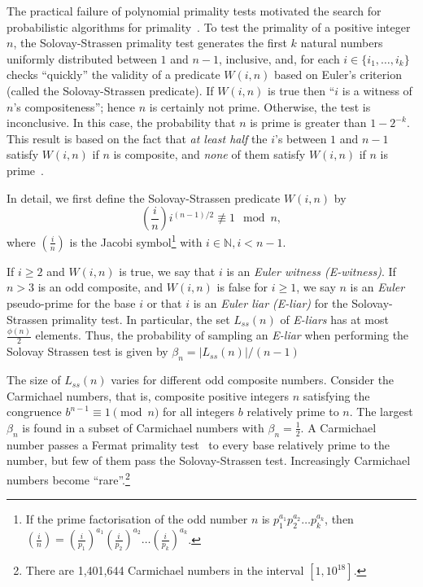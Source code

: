 \documentclass[l1pt]{elsarticle}
\begin{document}
The practical failure of polynomial primality tests motivated the search for probabilistic algorithms for primality~\cite{miller_prob_primality,rabin_prob_primality,solovay:84,solovay:118,Stiglic2011,Stiglic2011}.
To test the primality of  a positive integer $n$,  the Solovay-Strassen primality test generates the first $k$ natural numbers uniformly distributed between $1$ and $n -
1$, inclusive, and, for each $i\in\{i_1,\dots,i_k\}$ checks ``quickly'' the validity of a
predicate $W(i, n)$ based on Euler's criterion (called the Solovay-Strassen predicate).  If $W(i,
n)$ is true then ``$i$ is a witness of $n$'s compositeness''; hence $n$ is certainly not prime.
Otherwise, the test is inconclusive. In this case, the probability that $n$
is prime is greater than $1-2^{-k}$.  This result is based on the fact that {\it at
least half} the $i$'s between $1$ and $n - 1$ satisfy $W(i, n)$ if $n$ is
composite, and \emph{none} of them satisfy $W(i, n)$ if $n$ is
prime~\cite{Solovay77}.


In detail, we first define the Solovay-Strassen predicate $W(i,n)$ by
$$\left(\frac{i}{n}\right) i^{(n-1)/2} \not\equiv 1 \mod{n},$$
where $\left(\frac{i}{n}\right)$ is the Jacobi symbol\footnote{If the prime factorisation of the odd number $n$ is $p_1^{a_1}p_2^{a_2} \dots p_k^{a_k}$, then $\left(\frac{i}{n}\right) = \left(\frac{i}{p_1}\right)^{a_1} \left(\frac{i}{p_2}\right)^{a_2} \dots \left(\frac{i}{p_k}\right)^{a_k}$.} with $i\in\mathbb{N},i<n-1$.

If $i\geq 2$ and $W(i,n)$ is true, we say that $i$ is an \emph{Euler witness (E-witness)}. If $n > 3$ is an odd composite, and $W(i,n)$ is false for $i\geq 1$, we say $n$ is an \emph{Euler} pseudo-prime for the base $i$ or that $i$ is an \emph{Euler liar (E-liar)} for the Solovay-Strassen primality test. In particular, the set $L_{ss}(n)$ of \emph{E-liars} has at most $\frac{\phi(n)}{2}$ elements. Thus, the probability of sampling an \emph{E-liar} when performing the Solovay Strassen test is given by $\beta_n = |L_{ss}(n)|/(n-1)$

The size of $L_{ss}(n)$ varies for different odd composite numbers. Consider the Carmichael numbers, that is, composite positive integers $n$ satisfying the congruence $b^{n-1} \equiv 1 \pmod n$ for all integers $b$ relatively prime to $n$. The largest $\beta_n$ is found in a subset of Carmichael numbers with $\beta_n = \frac{1}{2}$.
A Carmichael number passes a Fermat primality test~\cite[Section 31.8]{introduc_algorithms} to every base relatively prime to the number, but few of them pass the Solovay-Strassen test. Increasingly
Carmichael numbers become ``rare''.\footnote{There are 1,401,644 Carmichael
numbers in the interval $[1, 10^{18}]$.}
\end{document}
